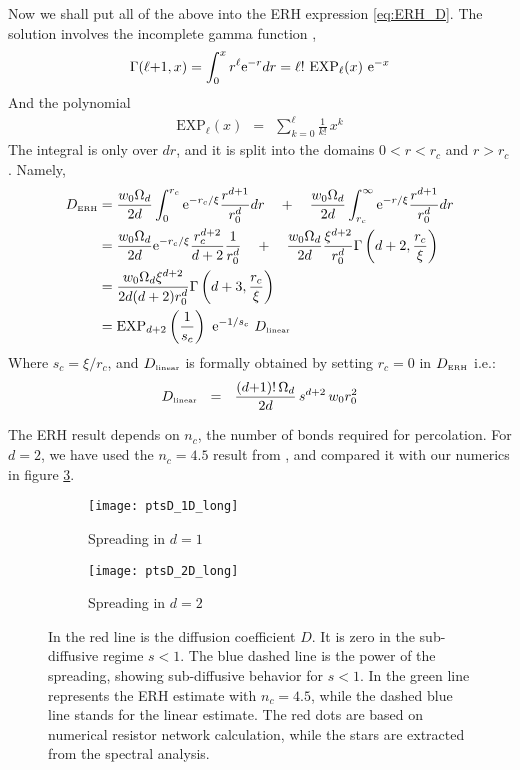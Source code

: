 Now we shall put all of the above into the ERH expression \ref{eq:ERH_D}.
The solution involves the incomplete gamma function \cite{_nist_????},
%
\begin{align}
\Gamma(\ell{+}1,x) = \int_0^x r^{\ell} \mbox{e}^{-r} dr = 
\ell! \ \mbox{EXP}_{\ell}(x)  \ \mbox{e}^{-x}
\end{align}
%
And the polynomial
%
\begin{align}\label{eq:EXP}
\mathrm{EXP}_{\ell}(x) \ \ = \ \ \sum_{k=0}^{\ell} \frac{1}{k!} \, x^k
\end{align}
% 
The integral is only over $dr$, and it is split  
into the domains ${0<r<r_c}$ and ${r>r_c}$. 
Namely, 
%
\begin{align}
D_{\tbox{ERH}} &= 
\frac{w_0\Omega_d}{2d}\int_0^{r_c} \eexp{-r_c / \xi} \frac{r^{d+1}}{r_0^d} dr 
\nonumber 
\quad+\quad \frac{w_0\Omega_d}{2d}\int_{r_c}^\infty \eexp{-r / \xi} \frac{r^{d+1}}{r_0^d} dr 
\nonumber \\
&= \frac{w_0\Omega_d}{2d} \eexp{-r_c / \xi} \frac{r_c^{d+2}}{d+2} \frac{1}{r_0^d}
\nonumber 
\quad+\quad \frac{w_0\Omega_d}{2d} \frac{\xi^{d+2}}{r_0^d} \Gamma\left(d+2,\frac{r_c}{\xi}\right)
\nonumber \\
&= \frac{w_0\Omega_d \xi^{d+2}}{2d(d+2)r_0^d}\Gamma\left(d+3,\frac{r_c}{\xi}\right)\\
&= \mathrm{EXP}_{d{+}2}\left(\frac{1}{s_c}\right)  \  \eexp{-1/s_c}  \ D_{\tbox{linear}}
\end{align}
%
Where $s_c=\xi/r_c$, and $D_{\mbox{\tiny linear}}$ is formally obtained by setting
$r_c=0$ in $D_{\mbox{\tiny ERH}}$  i.e.:
%
\begin{align}\label{eq:D_linear}
D_{\mbox{\tiny linear}} \ \ = \ \  
\frac{(d{+}1)!\,\Omega_d}{2d} \, s^{d{+}2} \, w_0 r_0^2
\end{align}

The ERH result depends on $n_c$, the number of bonds 
required for percolation.
For $d=2$, we have used the $n_c=4.5$ result from \cite{dalton_dependence_1964,*pike_percolation_1974}, 
and compared it with our numerics in figure \ref{fig:spread_2d}.

\begin{figure}
\begin{subfigure}{0.4\textwidth}
\texttt{[image: ptsD\_1D\_long]}
\caption{Spreading in $d{=}1$}
\label{fig:spread_1d}
\end{subfigure}
\begin{subfigure}{0.48\textwidth}
\texttt{[image: ptsD\_2D\_long]}
\caption{Spreading in $d{=}2$}
\label{fig:spread_2d}
\end{subfigure}
\caption{In  the red line is the diffusion coefficient $D$. It is zero in the sub-diffusive regime $s<1$. 
The blue dashed line is the power of the spreading, showing sub-diffusive behavior for $s<1$.
In \subref{fig:spread_2d} the green line represents the ERH estimate with $n_c=4.5$, while the dashed blue line stands for
the linear estimate. The red dots are based on numerical resistor network calculation, while the stars are extracted from the
spectral analysis. }
\end{figure}



